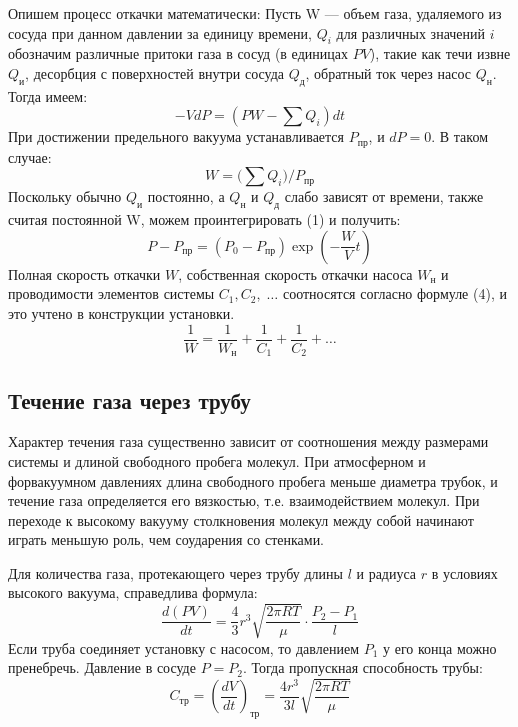 \documentclass[a4paper,12pt]{article}
\theoremstyle{definition}
\begin{document}
	Опишем процесс откачки математически: 
	Пусть W --- объем газа, удаляемого из сосуда при данном давлении за единицу времени, $Q_i$ для различных значений $i$ обозначим различные притоки газа в сосуд (в единицах $PV$), такие как течи извне $Q_\text{и}$, десорбция с поверхностей внутри сосуда $Q_\text{д}$, обратный ток через насос $Q_\text{н}$. Тогда имеем:
	\begin{equation}
		-VdP = \left(PW - \sum Q_i\right)dt
	\end{equation}
	При достижении предельного вакуума устанавливается $P_{\text{пр}}$, и $dP = 0$. В таком случае:
	\begin{equation}
		W = \biggl( \sum Q_i \biggr)\bigg/ P_{\text{пр}}
	\end{equation}
	Поскольку обычно $Q_\text{и}$ постоянно, а $Q_\text{н}$ и $Q_\text{д}$ слабо зависят от времени, также считая постоянной W, можем проинтегрировать (1) и получить:
	\begin{equation}
		P - P_{\text{пр}} = (P_0 - P_{\text{пр}})\exp\left(-\frac{W}{V}t\right)
		\label{exp}
	\end{equation}
	Полная скорость откачки $W$, собственная скорость откачки насоса $W_{\text{н}}$ и проводимости элементов системы $C_1, C_2,\;\ldots$ соотносятся согласно формуле (4), и это учтено в конструкции установки.
	\begin{equation}
		\frac{1}{W} = \frac{1}{W_\text{н}} + \frac{1}{C_1} + \frac{1}{C_2} + \ldots
	\end{equation}
	
	\subsection{Течение газа через трубу}
	
	Характер течения газа существенно зависит от соотношения между размерами системы и длиной свободного пробега молекул. При атмосферном и форвакуумном давлениях  длина свободного пробега меньше диаметра трубок, и течение газа определяется его вязкостью, т.е. взаимодействием молекул. При переходе к высокому вакууму столкновения молекул между собой начинают играть меньшую роль, чем соударения со стенками.
	
	Для количества газа, протекающего через трубу длины $l$ и радиуса $r$ в условиях высокого вакуума, справедлива формула:
	\begin{equation}
		\frac{d(PV)}{dt} = \frac{4}{3}r^3\sqrt{\frac{2\pi RT}{\mu}}\cdot\frac{P_2 - P_1}{l}
	\end{equation}
	Если труба соединяет установку с насосом, то давлением $P_1$ у его конца можно пренебречь. Давление в сосуде $P = P_2$. Тогда пропускная способность трубы:
	\begin{equation}
		C_\text{тр} = \left(\frac{dV}{dt}\right)_\text{тр} = \frac{4r^3}{3l}\sqrt{\frac{2\pi RT}{\mu}}
		\label{ty}
	\end{equation}
\end{document}

